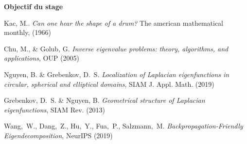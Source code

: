 \documentclass[a4paper,11pt]{article}
\begin{document}
{\bf Objectif du stage}\\



\vspace{-1.5em}
\renewcommand{\refname}{\normalsize Références}
%
\begin{thebibliography}{99}
\vspace{-1em}
{\scriptsize
{}
	Kac, M..
	{\it Can one hear the shape of a drum?}
	The american mathematical monthly, (1966)

	Chu, M., \& Golub, G.
	{\it Inverse eigenvalue problems: theory, algorithms, and
	applications}, OUP (2005)

	Nguyen, B. \& Grebenkov, D.~S.
	{\it Localization of Laplacian eigenfunctions in circular, spherical
	and elliptical domains}, SIAM J.  Appl. Math. (2019)

	Grebenkov, D.~S.  \& Nguyen, B.
	{\it Geometrical structure of Laplacian eigenfunctions},
	SIAM Rev. (2013)

	Wang,~W., Dang,~Z., Hu,~Y., Fua,~P., Salzmann,~M.
	{\it Backpropagation-Friendly Eigendecomposition},
	NeurIPS (2019)

}
\end{thebibliography}
\end{document}
